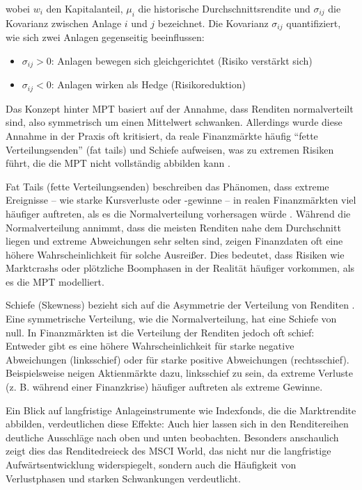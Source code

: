     \noindent wobei $w_i$ den Kapitalanteil, $\mu_i$ die historische Durchschnittsrendite und $\sigma_{ij}$ die Kovarianz zwischen Anlage $i$ und $j$ bezeichnet.
    Die Kovarianz $\sigma_{ij}$ quantifiziert, wie sich zwei Anlagen gegenseitig beeinflussen:
    \begin{itemize}
      \item $\sigma_{ij} > 0$: Anlagen bewegen sich gleichgerichtet (Risiko verstärkt sich)
      \item $\sigma_{ij} < 0$: Anlagen wirken als Hedge (Risikoreduktion)
    \end{itemize}

    Das Konzept hinter \acs{MPT} basiert auf der Annahme, dass Renditen normalverteilt sind, also symmetrisch um einen Mittelwert schwanken.
    Allerdings wurde diese Annahme in der Praxis oft kritisiert, da reale Finanzmärkte häufig \enquote{fette Verteilungsenden} (fat tails) und Schiefe aufweisen, was zu extremen Risiken führt, die die \acs{MPT} nicht vollständig abbilden kann \autocite[S. 21]{favre2002}.

    Fat Tails (fette Verteilungsenden) beschreiben das Phänomen, dass extreme Ereignisse -- wie starke Kursverluste oder -gewinne -- in realen Finanzmärkten viel häufiger auftreten, als es die Normalverteilung vorhersagen würde \autocite[S. 21]{favre2002}.
    Während die Normalverteilung annimmt, dass die meisten Renditen nahe dem Durchschnitt liegen und extreme Abweichungen sehr selten sind, zeigen Finanzdaten oft eine höhere Wahrscheinlichkeit für solche Ausreißer.
    Dies bedeutet, dass Risiken wie Marktcrashs oder plötzliche Boomphasen in der Realität häufiger vorkommen, als es die \acs{MPT} modelliert.

    Schiefe (Skewness) bezieht sich auf die Asymmetrie der Verteilung von Renditen \autocite[S. 21]{favre2002}.
    Eine symmetrische Verteilung, wie die Normalverteilung, hat eine Schiefe von null.
    In Finanzmärkten ist die Verteilung der Renditen jedoch oft schief:
    Entweder gibt es eine höhere Wahrscheinlichkeit für starke negative Abweichungen (linksschief) oder für starke positive Abweichungen (rechtsschief).
    Beispielsweise neigen Aktienmärkte dazu, linksschief zu sein, da extreme Verluste (z. B. während einer Finanzkrise) häufiger auftreten als extreme Gewinne.

    Ein Blick auf langfristige Anlageinstrumente wie Indexfonds, die die Marktrendite abbilden, verdeutlichen diese Effekte:
    Auch hier lassen sich in den Renditereihen deutliche Ausschläge nach oben und unten beobachten.
    Besonders anschaulich zeigt dies das Renditedreieck des MSCI World, das nicht nur die langfristige Aufwärtsentwicklung widerspiegelt, sondern auch die Häufigkeit von Verlustphasen und starken Schwankungen verdeutlicht.

